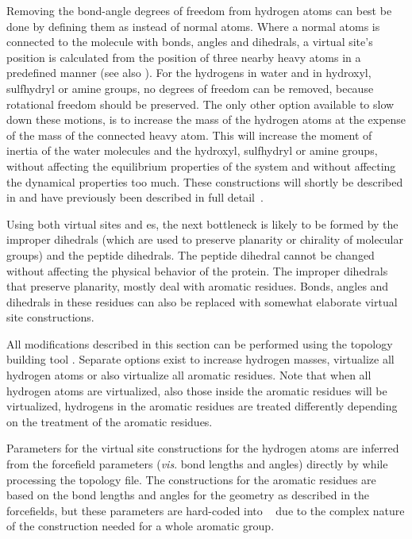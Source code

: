 Removing the bond-angle degrees of freedom from hydrogen atoms can
best be done by defining them as 
instead of normal atoms. Where a normal atoms is connected to the molecule
with bonds, angles and dihedrals, a virtual site's position is calculated
from the position of three nearby heavy atoms in a predefined manner
(see also ). For the hydrogens in water and in
hydroxyl, sulfhydryl or amine groups, no degrees of freedom can be
removed, because rotational freedom should be preserved. The only
other option available to slow down these motions, is to increase the
mass of the hydrogen atoms at the expense of the mass of the connected
heavy atom. This will increase the moment of inertia of the water
molecules and the hydroxyl, sulfhydryl or amine groups, without
affecting the equilibrium properties of the system and without
affecting the dynamical properties too much. These constructions will
shortly be described in  and have previously
been described in full detail~\cite{feenstra99}.

Using both virtual sites and es, the next
bottleneck is likely to be formed by the improper dihedrals (which are
used to preserve planarity or chirality of molecular groups) and the
peptide dihedrals. The peptide dihedral cannot be changed without
affecting the physical behavior of the protein. The improper dihedrals
that preserve planarity, mostly deal with aromatic residues. Bonds,
angles and dihedrals in these residues can also be replaced with
somewhat elaborate virtual site constructions.

All modifications described in this section can be performed using the
{\gromacs} topology building tool {\tt {}}. Separate
options exist to increase hydrogen masses, virtualize all hydrogen atoms
or also virtualize all aromatic residues. Note that when all hydrogen
atoms are virtualized, also those inside the aromatic residues will be
virtualized, {\ie} hydrogens in the aromatic residues are treated
differently depending on the treatment of the aromatic residues.

Parameters for the virtual site constructions for the hydrogen atoms are
inferred from the forcefield parameters ({\em vis}. bond lengths and
angles) directly by {\tt {}} while processing the
topology file.  The constructions for the aromatic residues are based
on the bond lengths and angles for the geometry as described in the
forcefields, but these parameters are hard-coded into {\tt
{}} due to the complex nature of the construction
needed for a whole aromatic group.

